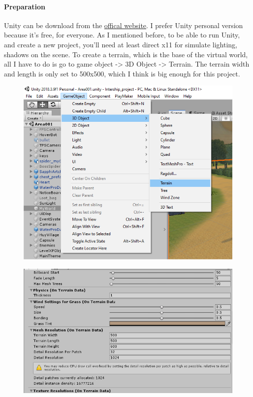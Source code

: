 \documentclass[a4paper, 13pt]{extarticle}
\begin{document}
 		  \paragraph{Preparation}
 		  Unity can be download from the \href{https://store.unity.com/}{offical website}. I prefer Unity personal version because it's free, for everyone. As I mentioned before, to be able to run Unity, and create a new project, you'll need at least direct x11 for simulate lighting, shadows on the scene. To create a terrain, which is the base of the virtual world, all I have to do is go to game object -> 3D Object -> Terrain. The terrain width and length is only set to 500x500, which I think is big enough for this project.  \begin{figure}[h]
 		  	\centering
 		  	\begin{minipage}{.4\textwidth}
 		  		\centering
 		  		\includegraphics[width=1\linewidth]{intructions/1.png}
 		  		\label{fig:test2}
 		  	\end{minipage}
 		  	\begin{minipage}{.4\textwidth}
 		  		\centering
 		  		\includegraphics[width=1.4\linewidth]{intructions/2.png}
 		  		\label{fig:test3}
 		  	\end{minipage}
 		  \end{figure}
\end{document}

